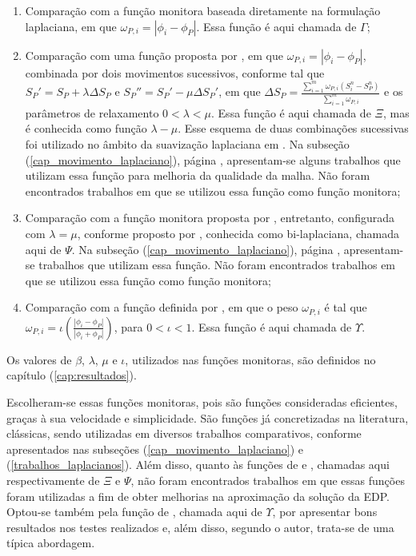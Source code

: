 \begin{enumerate}
 \item Comparação com a função monitora baseada diretamente na formulação laplaciana, em que $\omega_{P,i} = { | \phi_{i} - \phi_{P} | }$. Essa função é aqui chamada de $\Gamma$;
 
 \item Comparação com uma função proposta por , em que $\omega_{P,i} = { | \phi_{i} - \phi_{P} | }$, combinada por dois movimentos sucessivos, conforme tal que $S_{P}' = S_{P} + \lambda \Delta S_{P}$ e $S_{P}'' = S_{P}' - \mu \Delta S_{P}'$, em que $\Delta S_{P} =  \frac{ \sum_{i=1}^{m} \omega_{P,i}(S_{i}^{n} - S_{P}^{n}) } { \sum_{i=1}^{m} \omega_{P,i} }$ e os parâmetros de relaxamento $0 < \lambda < \mu$. Essa função é aqui chamada de $\Xi$, mas é conhecida como função $\lambda - \mu$. Esse esquema de duas combinações sucessivas foi utilizado no âmbito da suavização laplaciana em . Na subseção (\ref{cap_movimento_laplaciano}), página \pageref{cap_movimento_laplaciano}, apresentam-se alguns trabalhos que utilizam essa função para melhoria da qualidade da malha. Não foram encontrados trabalhos em que se utilizou essa função como função monitora; 
 
 \item Comparação com a função monitora proposta por , entretanto, configurada com $\lambda = \mu$, conforme proposto por , conhecida como bi-laplaciana, chamada aqui de $\Psi$. Na subseção (\ref{cap_movimento_laplaciano}), página \pageref{cap_movimento_laplaciano}, apresentam-se trabalhos que utilizam essa função. Não foram encontrados trabalhos em que se utilizou essa função como função monitora;
 
 \item Comparação com a função definida por , em que o peso $\omega_{P,i}$ é tal que $\omega_{P,i} = \iota \left( \frac { | \phi_{i} - \phi_{P} | } { | \phi_{i} + \phi_{P} | } \right) $, para $0 < \iota < 1$. Essa função é aqui chamada de $\Upsilon$.
\end{enumerate}

Os valores de $\beta$, $\lambda$, $\mu$ e $\iota$, utilizados nas funções monitoras, são definidos no capítulo (\ref{cap:resultados}).

Escolheram-se essas funções monitoras, pois são funções consideradas eficientes, graças à sua velocidade e simplicidade. São funções já concretizadas na literatura, clássicas, sendo utilizadas em diversos trabalhos comparativos, conforme apresentados nas subseções (\ref{cap_movimento_laplaciano}) e (\ref{trabalhos_laplacianos}). Além disso, quanto às funções de  e , chamadas aqui respectivamente de $\Xi$ e $\Psi$, não foram encontrados trabalhos em que essas funções foram utilizadas a fim de obter melhorias na aproximação da solução da EDP. Optou-se também pela função de , chamada aqui de $\Upsilon$, por apresentar bons resultados nos testes realizados e, além disso, segundo o autor, trata-se de uma típica abordagem.

